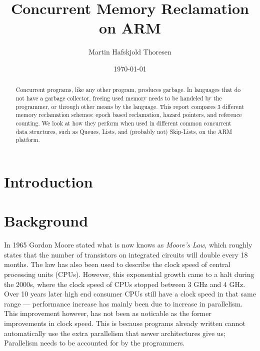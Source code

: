 \documentclass[a4paper,twoside]{article}
\begin{document}
\title{Concurrent Memory Reclamation on ARM}
\author{Martin Hafskjold Thoresen}
\date{\today}
\maketitle



\begin{abstract}
  Concurrent programs, like any other program, produces garbage.
  In languages that do not have a garbage collector, freeing used
  memory needs to be handeled by the programmer, or through other
  means by the language.
  This report compares 3 different memory reclamation schemes:
  epoch based reclamation, hazard pointers, and reference counting.
  We look at how they perform when used in different common concurrent
  data structures, such as Queues, Lists, and (probably not) Skip-Lists,
  on the ARM platform.
\end{abstract}

\section{Introduction}

\tableofcontents

\section{Background}

In 1965 Gordon Moore stated what is now knows as \emph{Moore's Law},
which roughly states that the number of transistors on integrated circuits
will double every 18 months.
The law has also been used to describe the clock speed of central processing
units (CPUs).
However, this exponential growth came to a halt during the 2000s, where
the clock speed of CPUs stopped between 3 GHz and 4 GHz.
Over 10 years later high end consumer CPUs still have a clock
speed in that same range --- performance increase has mainly been
due to increase in parallelism.
This improvement however, has not been as noticable as the former improvements in
clock speed. This is because programs already written cannot automatically
use the extra parallelism that newer architectures give us;
Parallelism needs to be accounted for by the programmers.
\end{document}
